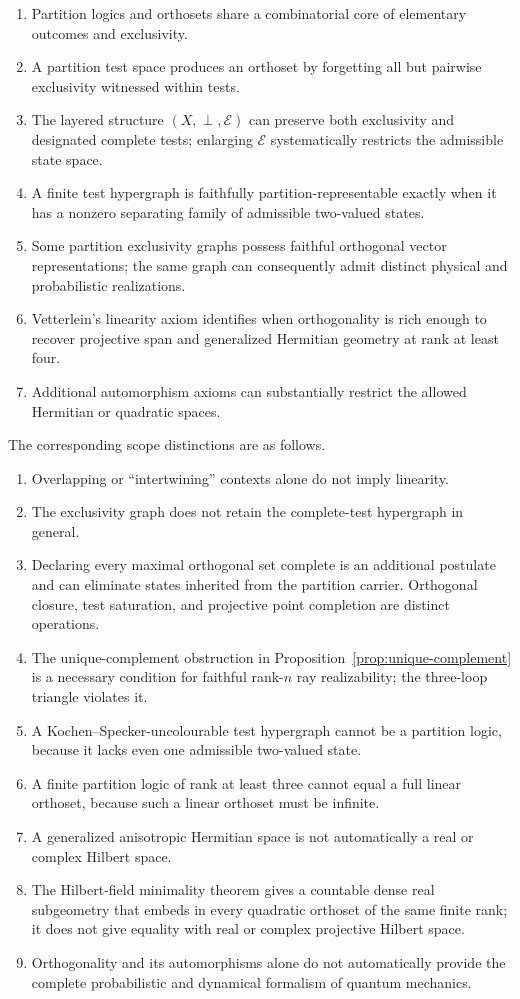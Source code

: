 \documentclass[
  aps,
  pra,
  twocolumn,
  amsmath,
  amssymb,
  longbibliography,
  nofootinbib,
  floatfix
]{revtex4-2}
\newcommand{\cE}{\mathcal E}
\begin{document}
\begin{enumerate}
\item Partition logics and orthosets share a combinatorial core of elementary
outcomes and exclusivity.
\item A partition test space produces an orthoset by forgetting all but
pairwise exclusivity witnessed within tests.
\item The layered structure $(X,\perp,\cE)$ can preserve both exclusivity and
designated complete tests; enlarging $\cE$ systematically restricts the
admissible state space.
\item A finite test hypergraph is faithfully partition-representable exactly
when it has a nonzero separating family of admissible two-valued states.
\item Some partition exclusivity graphs possess faithful orthogonal vector
representations; the same graph can consequently admit distinct physical and
probabilistic realizations.
\item Vetterlein's linearity axiom identifies when orthogonality is rich enough
to recover projective span and generalized Hermitian geometry at rank at least
four.
\item Additional automorphism axioms can substantially restrict the allowed
Hermitian or quadratic spaces.
\end{enumerate}

The corresponding scope distinctions are as follows.

\begin{enumerate}
\item Overlapping or ``intertwining'' contexts alone do not imply linearity.
\item The exclusivity graph does not retain the complete-test hypergraph in
general.
\item Declaring every maximal orthogonal set complete is an additional
postulate and can eliminate states inherited from the partition carrier.
Orthogonal closure, test saturation, and projective point completion are
distinct operations.
\item The unique-complement obstruction in
Proposition~\ref{prop:unique-complement} is a necessary condition for faithful
rank-$n$ ray realizability; the three-loop triangle violates it.
\item A Kochen--Specker-uncolourable test hypergraph cannot be a partition
logic, because it lacks even one admissible two-valued state.
\item A finite partition logic of rank at least three cannot equal a full linear
orthoset, because such a linear orthoset must be infinite.
\item A generalized anisotropic Hermitian space is not automatically a real or
complex Hilbert space.
\item The Hilbert-field minimality theorem gives a countable dense real
subgeometry that embeds in every quadratic orthoset of the same finite rank; it
does not give equality with real or complex projective Hilbert space.
\item Orthogonality and its automorphisms alone do not automatically provide
the complete probabilistic and dynamical formalism of quantum mechanics.
\end{enumerate}
\end{document}
